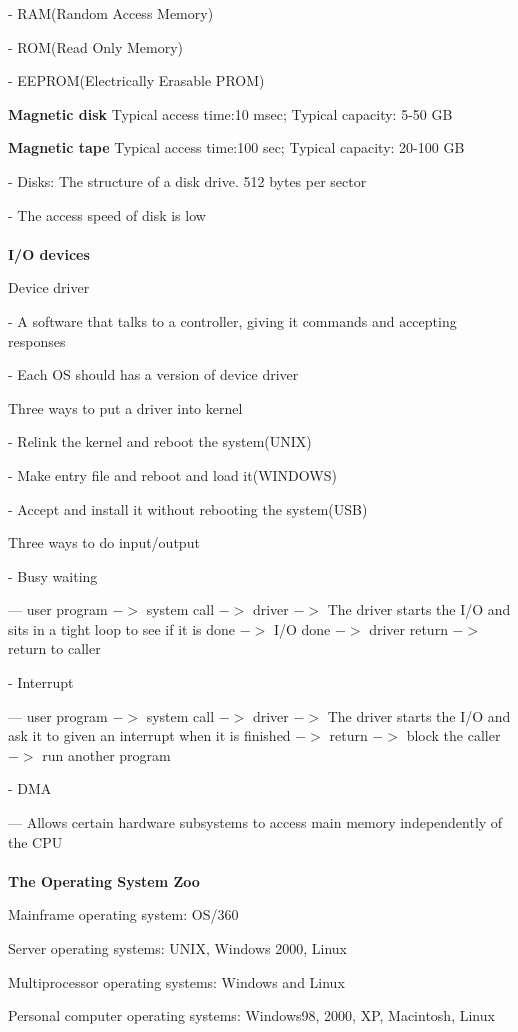 \documentclass[]{report}
\begin{document}
- RAM(Random Access Memory)

- ROM(Read Only Memory)

- EEPROM(Electrically Erasable PROM)

\textbf{Magnetic disk} Typical access time:10 msec; Typical capacity: 5-50 GB

\textbf{Magnetic tape} Typical access time:100 sec; Typical capacity: 20-100 GB

- Disks: The structure of a disk drive. 512 bytes per sector

- The access speed of disk is low\\\\
\textbf{I/O devices}

Device driver

- A software that talks to a controller, giving it commands and accepting responses

- Each OS should has a version of device driver

Three ways to put a driver into kernel

- Relink the kernel and reboot the system(UNIX)

- Make entry file and reboot and load it(WINDOWS)

- Accept and install it without rebooting the system(USB)

Three ways to do input/output

- Busy waiting

--- user program $->$ system call $->$ driver $->$ The driver starts the I/O and sits in a tight loop to see if it is done $->$ I/O done $->$ driver return $->$ return to caller

- Interrupt

--- user program $->$ system call $->$ driver $->$ The driver starts the I/O and ask it to given an interrupt when it is finished $->$ return $->$ block the caller $->$ run another program

- DMA

--- Allows certain hardware subsystems to access main memory independently of the CPU\\\\
\textbf{The Operating System Zoo}

Mainframe operating system: OS/360

Server operating systems: UNIX, Windows 2000, Linux

Multiprocessor operating systems: Windows and Linux

Personal computer operating systems: Windows98, 2000, XP, Macintosh, Linux
\end{document}
